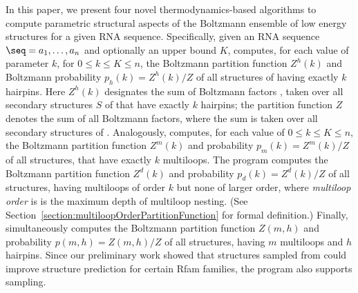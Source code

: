 In this paper, we present four novel
thermodynamics-based algorithms to compute parametric structural aspects of the
Boltzmann ensemble of low energy structures for a given RNA sequence.
Specifically, given an RNA sequence $\seq =a_1,\ldots,a_n$ and
optionally an upper bound $K$, {\rnahairpin} computes, for each value of
parameter $k$, for $0 \leq k \leq K \leq n$, the Boltzmann partition
function $Z^h(k)$ and
Boltzmann probability $p_h(k) = Z^h(k)/Z$ of all structures  of \seq having
exactly $k$ hairpins. Here $Z^h(k)$ designates the sum of Boltzmann factors
\boltzf{\str}, taken over all
secondary structures $S$ of \seq that have exactly $k$ hairpins; the
partition function $Z$ denotes the sum of all Boltzmann factors, where the
sum is taken over all secondary structures of \seq. Analogously,
{\rnamlnumber} computes, for each value of $0 \leq k \leq K \leq n$,
the Boltzmann partition function $Z^m(k)$ and probability
$p_m(k) = Z^m(k)/Z$ of all structures, that have exactly $k$
multiloops.
The program {\rnamlorder} computes the
Boltzmann partition function $Z^d(k)$ and probability
$p_d(k) = Z^d(k)/Z$ of all structures, having multiloops of order
$k$ but none of larger order, where {\em multiloop order} is
is the maximum depth of multiloop nesting.
(See Section~\ref{section:multiloopOrderPartitionFunction} for
formal definition.)
Finally, {\rnahairpinml} simultaneously computes the
Boltzmann partition function $Z(m,h)$ and probability
$p(m,h) = Z(m,h)/Z$ of all structures, having $m$ multiloops and
$h$ hairpins. Since our preliminary work showed that structures sampled
from {\rnahairpin} could improve structure prediction for certain Rfam
families, the program {\rnahairpinml} also supports sampling.

